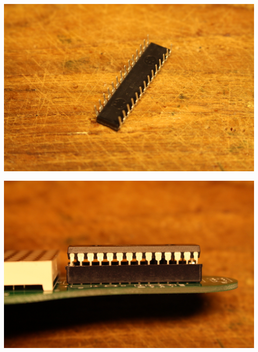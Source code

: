 \documentclass{article}
\begin{document}
\vspace{0.5cm}

\begin{minipage}[b]{0.5\textwidth}
	\includegraphics[width=\textwidth]{Bilder2021/IMG_8168.JPG}
\end{minipage}
\begin{minipage}[b]{0.5\textwidth}
	\includegraphics[width=\textwidth]{Bilder2021/IMG_8169.JPG}
\end{minipage}

\vspace{0.5cm}
\end{document}
